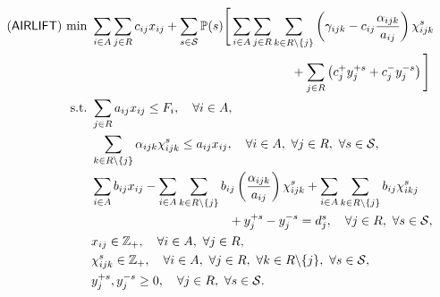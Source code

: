 \begin{subequations} \label{airlift:formulation}
	\begin{align}
	(\textsf{AIRLIFT})\ \textrm{min}\ &\sum_{i\in A}\sum_{j\in R} c_{ij}x_{ij}+\sum_{s\in\mathcal{S}}\operatorname*{\mathbb{P}}(s)\Bigg[ \sum_{i\in A}\sum_{j\in R}\sum_{k\in R\backslash \{j\} }\left( \gamma_{ijk}-c_{ij}\frac{\alpha_{ijk}}{a_{ij}} \right)\chi_{ijk}^s \nonumber \\ 
	&\qquad\qquad\qquad\qquad\qquad\qquad\qquad\qquad+\sum_{j\in R}\left( c_j^+ y_j^{+s}+c_j^- y_j^{-s} \right)\Bigg]\label{airlift:obj} \\
	\textrm{s.t.}\ & \sum_{j\in R}a_{ij}x_{ij}\le F_i,\quad\forall i\in A,	\label{airlift:b}\\
	&\sum_{k\in R\backslash\{j\}}\alpha_{ijk}\chi_{ijk}^s\le a_{ij}x_{ij},\quad\forall i\in A,\ \forall j\in R,\ \forall s\in\mathcal{S}, \label{airlift:c}\\
	&\sum_{i\in A}b_{ij}x_{ij}-\sum_{i\in A}\sum_{k\in R\backslash\{j\}}b_{ij}\left(\frac{\alpha_{ijk}}{a_{ij}}\right)\chi_{ijk}^s + \sum_{i\in A}\sum_{k\in R\backslash\{j\}}b_{ij}\chi_{ikj}^s \nonumber \\
	&\qquad\qquad\qquad\qquad\qquad\quad+ y_j^{+s} - y_j^{-s} = d_j^s,\quad \forall j\in R,\ \forall s\in\mathcal{S}, \label{airlift:d}\\
	&x_{ij}\in\mathbb{Z}_+,\quad\forall i\in A,\ \forall j\in R, \\
	&\chi_{ijk}^s\in\mathbb{Z}_+,\quad\forall i\in A,\ \forall j\in R,\ \forall k\in R\backslash\{j\},\ \forall s\in\mathcal{S}, \\
	& y_j^{+s},y_j^{-s}\ge 0,\quad\forall j\in R,\ \forall s\in\mathcal{S}.
	\end{align}
\end{subequations}

